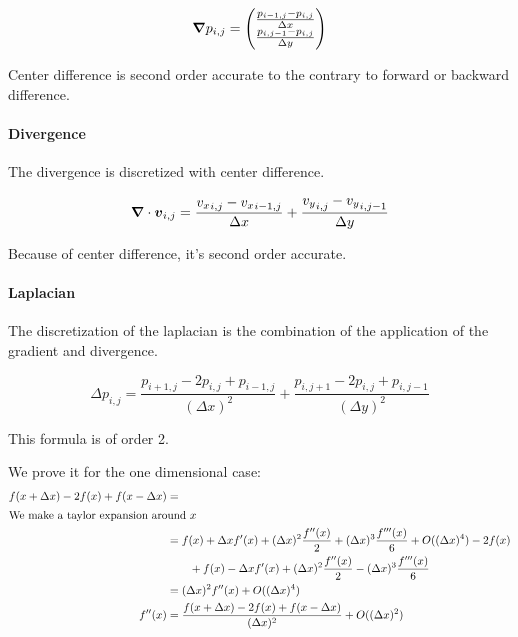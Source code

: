 \begin{equation}
  {\boldsymbol {\nabla}}p_{i,j}=\begin{pmatrix}
                       	\frac{p_{i-1,j}-p_{i,j}}{\Delta x}\\
                       	\frac{p_{i,j-1}-p_{i,j}}{\Delta y}\\
                       \end{pmatrix}
\end{equation}

Center difference is second order accurate to the contrary to forward or backward difference.

\paragraph{Divergence}
The divergence is discretized with center difference.

\begin{equation}
	{\boldsymbol {\nabla}}\cdot {\boldsymbol {v}}_{i,j}=\frac{{v_{x}}_{i,j}-{v_{x}}_{i-1,j}}{\Delta x}+\frac{{v_{y}}_{i,j}-{v_{y}}_{i,j-1}}{\Delta y}
\end{equation}

Because of center difference, it's second order accurate.

\paragraph{Laplacian}
\label{fixed:Laplacian}
The discretization of the laplacian is the combination of the application of the gradient and divergence.

\begin{equation}
  \Delta p_{i,j}=\frac{p_{i+1,j}-2p_{i,j}+p_{i-1,j}}{(\Delta x)^2}+\frac{p_{i,j+1}-2p_{i,j}+p_{i,j-1}}{(\Delta y)^2}
\end{equation}

This formula is of order 2.

We prove it for the one dimensional case:
\begin{align*}
  f(x+\Delta x)-2f(x)+f(x-\Delta x)&=\\
  \intertext{We make a taylor expansion around $x$}
  &=f(x)+\Delta x f'(x) +(\Delta x)^2 \frac{f''(x)}{2}+(\Delta x)^3 \frac{f'''(x)}{6}+O((\Delta x)^4)-2f(x)\\
  &\qquad+f(x)-\Delta x f'(x) +(\Delta x)^2 \frac{f''(x)}{2}-(\Delta x)^3 \frac{f'''(x)}{6}\\
  &=(\Delta x)^2f''(x) +O((\Delta x)^4)\\
  f''(x)&=\frac{f(x+\Delta x)-2f(x)+f(x-\Delta x)}{(\Delta x)^2}+O((\Delta x)^2)
\end{align*}

